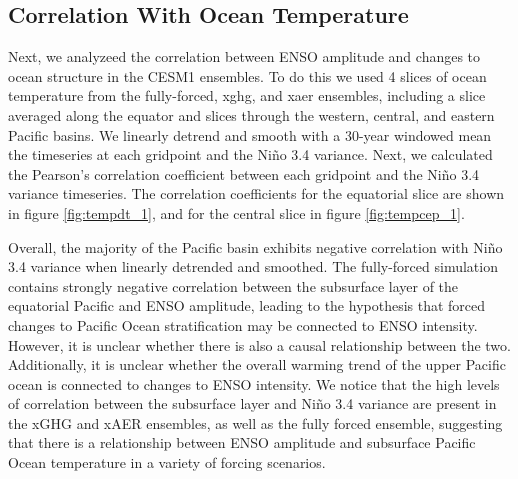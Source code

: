 \documentclass[11pt]{article}
\begin{document}
\subsection{Correlation With Ocean Temperature}
\label{sec:org9556be7}
Next, we analyzeed the correlation between ENSO amplitude and changes to ocean structure in the CESM1 ensembles. To do this we used 4 slices of ocean temperature from the fully-forced, xghg, and xaer ensembles, including a slice averaged along the equator and slices through the western, central, and eastern Pacific basins. We linearly detrend and smooth with a 30-year windowed mean the timeseries at each gridpoint and the Niño 3.4 variance. Next, we calculated the Pearson's correlation coefficient between each gridpoint and the Niño 3.4 variance timeseries. The correlation coefficients for the equatorial slice are shown in figure \ref{fig:tempdt_1}, and for the central slice in figure \ref{fig:tempcep_1}.

Overall, the majority of the Pacific basin exhibits negative correlation with Niño 3.4 variance when linearly detrended and smoothed. The fully-forced simulation contains strongly negative correlation between the subsurface layer of the equatorial Pacific and ENSO amplitude, leading to the hypothesis that forced changes to Pacific Ocean stratification may be connected to ENSO intensity. However, it is unclear whether there is also a causal relationship between the two. Additionally, it is unclear whether the overall warming trend of the upper Pacific ocean is connected to changes to ENSO intensity. We notice that the high levels of correlation between the subsurface layer and Niño 3.4 variance are present in the xGHG and xAER ensembles, as well as the fully forced ensemble, suggesting that there is a relationship between ENSO amplitude and subsurface Pacific Ocean temperature in a variety of forcing scenarios.
\end{document}
